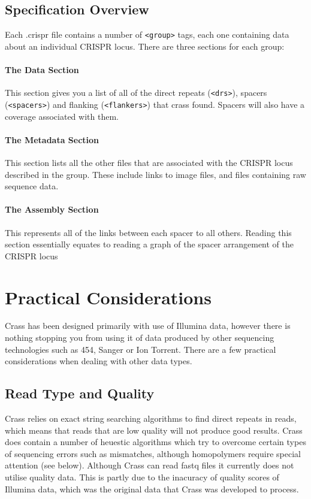 \documentclass[11pt]{article} %
\begin{document}
\subsection{Specification Overview}
Each .crispr file contains a number of \lstinline[language=XML_new]$<group>$ tags, each one containing data about an individual CRISPR locus.  There are three sections for each group:
\paragraph{The Data Section}
This section gives you a list of all of the direct repeats (\lstinline[language=XML_new]$<drs>$), spacers (\lstinline[language=XML_new]$<spacers>$) and flanking (\lstinline[language=XML_new]$<flankers>$) that crass found.  Spacers will also have a coverage associated with them.
\paragraph{The Metadata Section}
This section lists all the other files that are associated with the CRISPR locus described in the group.  These include links to image files, and files containing raw sequence data.
\paragraph{The Assembly Section}
This represents all of the links between each spacer to all others.  Reading this section essentially equates to reading a graph of the spacer arrangement of the CRISPR locus


\section{Practical Considerations}
Crass has been designed primarily with use of Illumina data, however there is nothing stopping you from using it of data produced by other sequencing technologies such as 454, Sanger or Ion Torrent.  There are a few practical considerations when dealing with other data types.
\subsection{Read Type and Quality}
 Crass relies on exact string searching algorithms to find direct repeats in reads, which means that reads that are low quality will not produce good results.  Crass does contain a number of heuestic algorithms which try to overcome certain types of sequencing errors such as mismatches, although homopolymers require special attention (see below).  Although Crass can read fastq files it currently does not utilise quality data.  This is partly due to the inacuracy of quality scores of Illumina data, which was the original data that Crass was developed to process. 
\end{document}
